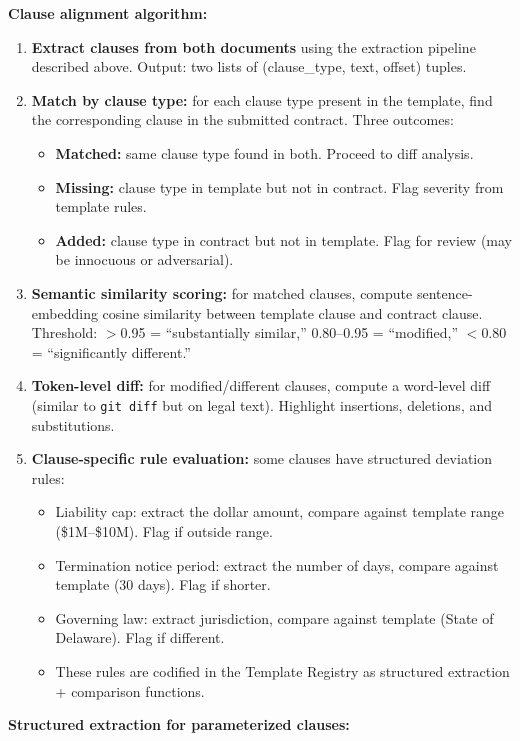 \textbf{Clause alignment algorithm:}

\begin{enumerate}
  \item \textbf{Extract clauses from both documents} using the extraction pipeline described above. Output: two lists of (clause\_type, text, offset) tuples.
  \item \textbf{Match by clause type:} for each clause type present in the template, find the corresponding clause in the submitted contract. Three outcomes:
  \begin{itemize}
    \item \textbf{Matched:} same clause type found in both. Proceed to diff analysis.
    \item \textbf{Missing:} clause type in template but not in contract. Flag severity from template rules.
    \item \textbf{Added:} clause type in contract but not in template. Flag for review (may be innocuous or adversarial).
  \end{itemize}
  \item \textbf{Semantic similarity scoring:} for matched clauses, compute sentence-embedding cosine similarity between template clause and contract clause. Threshold: $>$0.95 = ``substantially similar,'' 0.80--0.95 = ``modified,'' $<$0.80 = ``significantly different.''
  \item \textbf{Token-level diff:} for modified/different clauses, compute a word-level diff (similar to \texttt{git diff} but on legal text). Highlight insertions, deletions, and substitutions.
  \item \textbf{Clause-specific rule evaluation:} some clauses have structured deviation rules:
  \begin{itemize}
    \item Liability cap: extract the dollar amount, compare against template range (\$1M--\$10M). Flag if outside range.
    \item Termination notice period: extract the number of days, compare against template (30 days). Flag if shorter.
    \item Governing law: extract jurisdiction, compare against template (State of Delaware). Flag if different.
    \item These rules are codified in the Template Registry as structured extraction + comparison functions.
  \end{itemize}
\end{enumerate}

\textbf{Structured extraction for parameterized clauses:}

